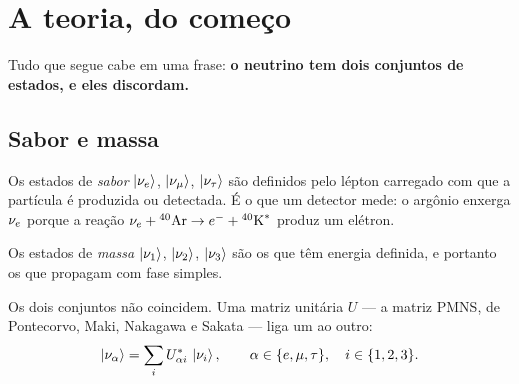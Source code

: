 \chapter{A teoria, do começo}
\label{cap:teoria}

Tudo que segue cabe em uma frase: \textbf{o neutrino tem dois conjuntos de
estados, e eles discordam.}

\section{Sabor e massa}

Os estados de \emph{sabor} $\left|\nu_e\right\rangle$, $\left|\nu_\mu\right\rangle$, $\left|\nu_\tau\right\rangle$ são
definidos pelo lépton carregado com que a partícula é produzida ou detectada.
É o que um detector mede: o argônio enxerga $\nu_e$ porque a reação
$\nu_e + {}^{40}\text{Ar} \to e^- + {}^{40}\text{K}^*$ produz um elétron.

Os estados de \emph{massa} $\left|\nu_1\right\rangle$, $\left|\nu_2\right\rangle$, $\left|\nu_3\right\rangle$ são os
que têm energia definida, e portanto os que propagam com fase simples.

Os dois conjuntos não coincidem. Uma matriz unitária $U$ --- a matriz PMNS, de
Pontecorvo, Maki, Nakagawa e Sakata --- liga um ao outro:
\begin{equation}
  \left|\nu_\alpha\right\rangle = \sum_{i} U_{\alpha i}^{*}\,\left|\nu_i\right\rangle,
  \qquad \alpha \in \{e,\mu,\tau\},\quad i \in \{1,2,3\}.
\end{equation}

